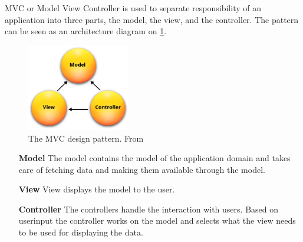 MVC or Model View Controller\citet{aspmvc} is used to separate responsibility of an application into three parts, the model, the view, and the controller.
The pattern can be seen as an architecture diagram on \cref{mvcdiagram}.

\begin{figure}[h]
\center
\includegraphics[width=0.4\textwidth]{graphics/mvc}
\caption{The MVC design pattern. From \citet{aspmvc}}
\label{mvcdiagram}
\end{figure}

\begin{itemize}
\item[\textbf{Model}] The model contains the model of the application domain and takes care of fetching data and making them available through the model.
\item[\textbf{View}] View displays the model to the user.
\item[\textbf{Controller}] The controllers handle the interaction with users. Based on userinput the controller works on the model and selects what the view needs to be used for displaying the data.
\end{itemize}